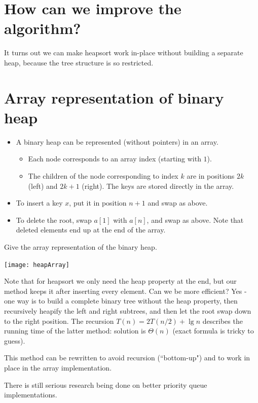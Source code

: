 \section{How can we improve the algorithm?}
It turns out we can make heapsort work in-place without building a separate heap, 
because the tree structure is so restricted.

\section{Array representation of binary heap}
\begin{itemize}
  \item A binary heap can be represented  (without pointers) in an array. 
  \begin{itemize}
	\item Each node corresponds to an array index (starting with $1$). 
	\item The children of the node corresponding to index $k$ are in positions $2k$ (left) 
	and $2k+1$ (right). The keys are stored directly in the array.
  \end{itemize}
  \item To insert a key $x$, put it in position $n+1$ and swap as above.
  \item To delete the root, swap $a[1]$ with $a[n]$, and swap as above. 
  Note that deleted elements end up at the end of the array.
\end{itemize}

\begin{Boxample}[0]
Give the array representation of the binary heap.
\begin{center}
\texttt{[image: heapArray]}
\end{center}
\end{Boxample}

Note that for heapsort we only need the heap property at the end, but our method keeps it after inserting every element. 
Can we be more efficient? Yes - one way is to build a complete binary tree without the heap property, then
recursively heapify the left and right subtrees, and then let the root swap 
down to the right position. The recursion $T(n) = 2T(n/2) + \lg n$ describes the running time of the 
latter method: solution is $\Theta(n)$ (exact formula is tricky to guess).
 
This method can be rewritten to avoid recursion (``bottom-up") and to work 
in place in the array implementation. 

There is still serious research being done on better priority queue implementations.

